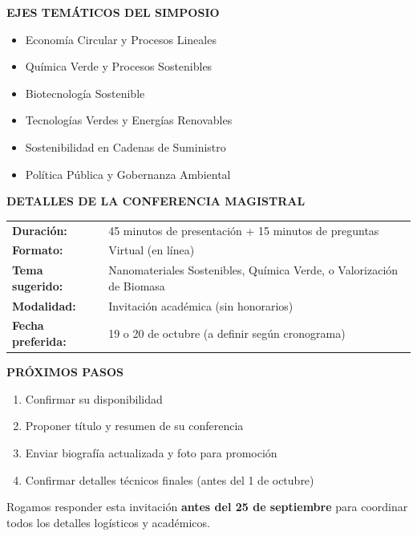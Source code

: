 \documentclass[12pt,a4paper]{article}
\begin{document}
\vspace{0.5cm}

\noindent
\textbf{EJES TEMÁTICOS DEL SIMPOSIO}

\begin{itemize}
  \item Economía Circular y Procesos Lineales
  \item Química Verde y Procesos Sostenibles
  \item Biotecnología Sostenible
  \item Tecnologías Verdes y Energías Renovables
  \item Sostenibilidad en Cadenas de Suministro
  \item Política Pública y Gobernanza Ambiental
\end{itemize}

\vspace{0.5cm}

\noindent
\textbf{DETALLES DE LA CONFERENCIA MAGISTRAL}

\begin{tabular}{ll}
\textbf{Duración:} & 45 minutos de presentación + 15 minutos de preguntas \\
\textbf{Formato:} & Virtual (en línea) \\
\textbf{Tema sugerido:} & Nanomateriales Sostenibles, Química Verde, o Valorización de Biomasa \\
\textbf{Modalidad:} & Invitación académica (sin honorarios) \\
\textbf{Fecha preferida:} & 19 o 20 de octubre (a definir según cronograma) \\
\end{tabular}

\vspace{0.5cm}

\noindent
\textbf{PRÓXIMOS PASOS}

\begin{enumerate}
  \item Confirmar su disponibilidad
  \item Proponer título y resumen de su conferencia
  \item Enviar biografía actualizada y foto para promoción
  \item Confirmar detalles técnicos finales (antes del 1 de octubre)
\end{enumerate}

\vspace{0.8cm}

Rogamos responder esta invitación \textbf{antes del 25 de septiembre} para coordinar todos los detalles logísticos y académicos.
\end{document}
